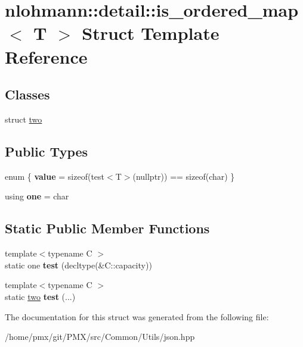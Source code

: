 \hypertarget{structnlohmann_1_1detail_1_1is__ordered__map}{}\section{nlohmann\+:\+:detail\+:\+:is\+\_\+ordered\+\_\+map$<$ T $>$ Struct Template Reference}
\label{structnlohmann_1_1detail_1_1is__ordered__map}
\subsection*{Classes}
\begin{DoxyCompactItemize}
\item 
struct \hyperlink{structnlohmann_1_1detail_1_1is__ordered__map_1_1two}{two}
\end{DoxyCompactItemize}
\subsection*{Public Types}
\begin{DoxyCompactItemize}
\item 
\mbox{\label{structnlohmann_1_1detail_1_1is__ordered__map_a958fafd82f22a4b7281e7b5462576c2c}} 
enum \{ {\bfseries value} = sizeof(test$<$T$>$(nullptr)) == sizeof(char)
 \}
\item 
\mbox{\label{structnlohmann_1_1detail_1_1is__ordered__map_a99a559f257bee6888355dc2d18ed2a17}} 
using {\bfseries one} = char
\end{DoxyCompactItemize}
\subsection*{Static Public Member Functions}
\begin{DoxyCompactItemize}
\item 
\mbox{\label{structnlohmann_1_1detail_1_1is__ordered__map_adae06dbd38b0f19c5930d37db1a476b1}} 
{\footnotesize template$<$typename C $>$ }\\static one {\bfseries test} (decltype(\&C\+::capacity))
\item 
\mbox{\label{structnlohmann_1_1detail_1_1is__ordered__map_ac566c43218f7753a8c7c1867c907d1c4}} 
{\footnotesize template$<$typename C $>$ }\\static \hyperlink{structnlohmann_1_1detail_1_1is__ordered__map_1_1two}{two} {\bfseries test} (...)
\end{DoxyCompactItemize}


The documentation for this struct was generated from the following file\+:\begin{DoxyCompactItemize}
\item 
/home/pmx/git/\+P\+M\+X/src/\+Common/\+Utils/json.\+hpp\end{DoxyCompactItemize}

